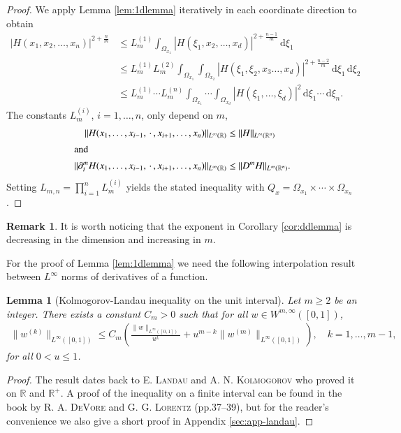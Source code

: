 \documentclass[11pt,a4paper,reqno]{amsart}
\theoremstyle{plain}
\newtheorem{lemma}[proposition]{Lemma}
\theoremstyle{definition}
\newtheorem{remark}[proposition]{Remark}
\begin{document}
\begin{proof}
	We apply Lemma \ref{lem:1dlemma} iteratively in each coordinate direction to obtain
	\begin{align*}
		|H(x_1, x_2, \dots, x_n)|^{2+\frac{n}{m}} &\leq L_m^{(1)} \int_{\Omega_{x_1}} |H(\xi_1, x_2, \dots, x_d)|^{2+\frac{n-1}{m}}\,\mathrm{d}\xi_1 \\
		&\leq L_m^{(1)}L_m^{(2)} \int_{\Omega_{x_1}}\int_{\Omega_{x_2}} |H(\xi_1, \xi_2, x_3 \dots, x_d)|^{2+\frac{n-2}{m}}\,\mathrm{d}\xi_1\,\mathrm{d}\xi_2 \\
		&\leq L_m^{(1)}\cdots L_m^{(n)} \int_{\Omega_{x_1}}\cdots\int_{\Omega_{x_d}} |H(\xi_1, \dots, \xi_d)|^{2}\,\mathrm{d}\xi_1\cdots\,\mathrm{d}\xi_n.
	\end{align*}
	The constants $L_m^{(i)}$, $i=1, \dots, n$, only depend on $m$, \
	\begin{align*}
		\|H(x_1, \dots, x_{i-1}, \,\cdot\,, x_{i+1}, \dots, x_n)\|_{L^{\infty}({\mathbb{R}})} &\leq \|H\|_{L^{\infty}({\mathbb{R}}^n)} \\
		\intertext{and }
		\|\partial_i^m H(x_1, \dots, x_{i-1}, \,\cdot\,, x_{i+1}, \dots, x_n)\|_{L^{\infty}({\mathbb{R}})} &\leq \|D^m H\|_{L^{\infty}({\mathbb{R}}^n)}.
	\end{align*}
	Setting $L_{m,n} = \prod_{i=1}^n L_m^{(i)}$ yields the stated inequality with $Q_x = \Omega_{x_1}\times \cdots \times \Omega_{x_n}$.
\end{proof}
\begin{remark}
It is worth noticing that the exponent in Corollary \ref{cor:ddlemma} is decreasing in the dimension and increasing in $m$.
\end{remark}

For the proof of Lemma \ref{lem:1dlemma} we need the following interpolation result between $L^{\infty}$ norms of derivatives of a function.

\begin{lemma}[Kolmogorov-Landau inequality on the unit interval]\label{lem:landau}
	Let $m\geq 2$ be an integer. There exists a constant $C_m>0$ such that for all $w\in W^{m, \infty}([0,1])$,
	\begin{align*}
		\|w^{(k)}\|_{L^{\infty}([0,1])} \leq C_m \left( \frac{\|w\|_{L^{\infty}([0,1])}}{u^k} + u^{m-k} \|w^{(m)}\|_{L^{\infty}([0,1])} \right), \quad k=1, \dots, m-1,
	\end{align*}
	for all $0< u \leq 1$.
\end{lemma}

\begin{proof}
The result dates back to \textsc{E. Landau} and \textsc{A. N. Kolmogorov} who proved it on ${\mathbb{R}}$ and ${\mathbb{R}}^+$. A proof of the inequality on a finite interval can be found in the book by \textsc{R. A. DeVore} and \textsc{G. G. Lorentz} \cite{DL93} (pp.37--39), but for the reader's convenience we also give a short proof in Appendix \ref{sec:app-landau}.
\end{proof}
\end{document}

